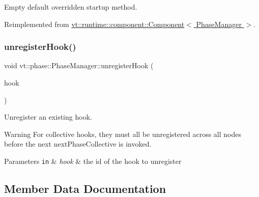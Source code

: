 Empty default overridden startup method. 



Reimplemented from \hyperlink{structvt_1_1runtime_1_1component_1_1_component_aad3974307ab3b2e1df389a91310f68c2}{vt\+::runtime\+::component\+::\+Component$<$ Phase\+Manager $>$}.

\mbox{\label{structvt_1_1phase_1_1_phase_manager_a78334fd49c35f694f1e5fe5c560dc211}} 
\subsubsection{\texorpdfstring{unregister\+Hook()}{unregisterHook()}}
{\footnotesize\ttfamily void vt\+::phase\+::\+Phase\+Manager\+::unregister\+Hook (\begin{DoxyParamCaption}\item[{\hyperlink{structvt_1_1phase_1_1_phase_hook_i_d}{Phase\+Hook\+ID}}]{hook }\end{DoxyParamCaption})}



Unregister an existing hook. 

\begin{DoxyWarning}{Warning}
For collective hooks, they must all be unregistered across all nodes before the next {\ttfamily next\+Phase\+Collective} is invoked.
\end{DoxyWarning}

\begin{DoxyParams}[1]{Parameters}
\mbox{\tt in}  & {\em hook} & the id of the hook to unregister \\
\hline
\end{DoxyParams}


\subsection{Member Data Documentation}
\mbox{\label{structvt_1_1phase_1_1_phase_manager_aafc873771fb849243f082cba71f36672}} 
